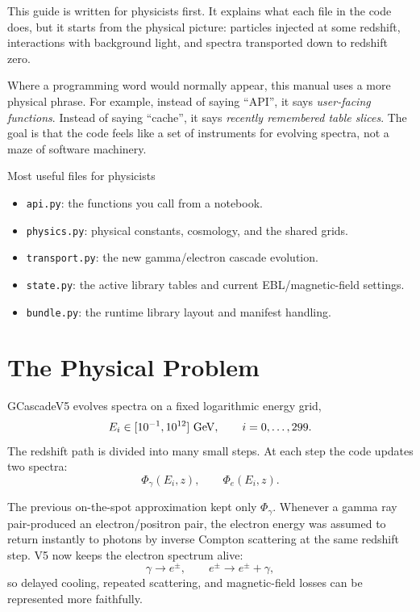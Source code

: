 \documentclass[11pt]{article}
\newcommand{\code}[1]{\texttt{#1}}
\begin{document}
This guide is written for physicists first. It explains what each file in the
code does, but it starts from the physical picture: particles injected at some
redshift, interactions with background light, and spectra transported down to
redshift zero.

Where a programming word would normally appear, this manual uses a more
physical phrase. For example, instead of saying ``API'', it says
\emph{user-facing functions}. Instead of saying ``cache'', it says
\emph{recently remembered table slices}. The goal is that the code feels like a
set of instruments for evolving spectra, not a maze of software machinery.

\begin{guidebox}{Most useful files for physicists}
\begin{itemize}
  \item \code{api.py}: the functions you call from a notebook.
  \item \code{physics.py}: physical constants, cosmology, and the shared grids.
  \item \code{transport.py}: the new gamma/electron cascade evolution.
  \item \code{state.py}: the active library tables and current EBL/magnetic-field settings.
  \item \code{bundle.py}: the runtime library layout and manifest handling.
\end{itemize}
\end{guidebox}

\section{The Physical Problem}

GCascadeV5 evolves spectra on a fixed logarithmic energy grid,
\[
  E_i \in [10^{-1},10^{12}]~{\rm GeV}, \qquad i=0,\ldots,299 .
\]
The redshift path is divided into many small steps. At each step the code
updates two spectra:
\[
  \Phi_\gamma(E_i,z), \qquad \Phi_e(E_i,z).
\]

The previous on-the-spot approximation kept only $\Phi_\gamma$. Whenever a
gamma ray pair-produced an electron/positron pair, the electron energy was
assumed to return instantly to photons by inverse Compton scattering at the
same redshift step. V5 now keeps the electron spectrum alive:
\[
  \gamma \longrightarrow e^\pm,
  \qquad
  e^\pm \longrightarrow e^\pm+\gamma,
\]
so delayed cooling, repeated scattering, and magnetic-field losses can be
represented more faithfully.
\end{document}

